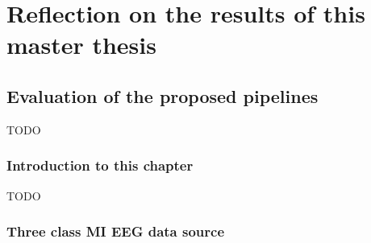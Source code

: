 


\part{Reflection on the results of this master thesis}
\label{part:reflection}

\chapter{Evaluation of the proposed pipelines}
\label{ch:evaluation}
TODO

\section{Introduction to this chapter}
\label{sec:evaluation_introduction}

TODO

\section{Three class MI EEG data source}
\label{sec:evaluation_data_source}


